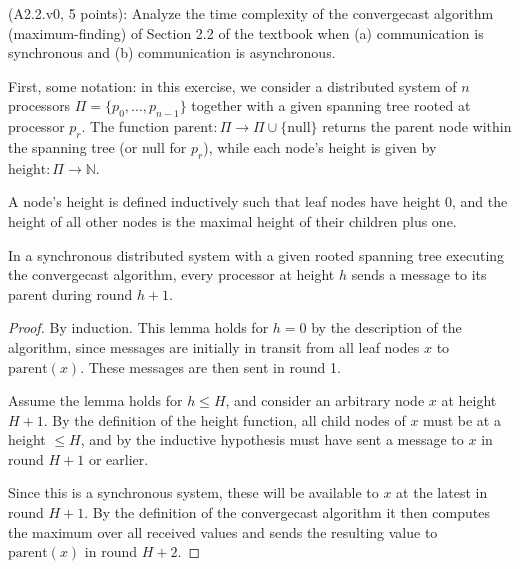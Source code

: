 \begin{Exc}{(A2.2.v0, 5 points):} \label{exc:1}
Analyze the time complexity of the convergecast algorithm
(maximum-finding) of Section 2.2 of the textbook when (a) communication is
synchronous and (b) communication is asynchronous.
\end{Exc}

\begin{comment}
Hint: For the synchronous case, prove that during round t + 1, a processor at
height t sends a message to its parent. For the asynchronous case, prove that
by time t, a processor at height t has sent a message to its parent.
\end{comment}

\newcommand{\prnt}[1]{\text{parent}(#1)}
\newcommand{\hght}[1]{\text{height}(#1)}

First, some notation: in this exercise, we consider a distributed system of $n$
processors $\Pi=\{p_0,\dots,p_{n-1}\}$ together with a given spanning tree
rooted at processor $p_r$. The function
$\text{parent}: \Pi \rightarrow \Pi \cup \{ \text{null} \}$ returns the parent node
within the spanning tree (or null for $p_r$), while each node's height is given by
$\text{height}: \Pi \rightarrow \mathbb{N}$.

\begin{definition}
A node's height is defined inductively such that leaf nodes have height 0,
and the height of all other nodes is the maximal height of their children plus one.
\end{definition}


\begin{lemma} \label{lemma:1sync}
In a synchronous distributed system with a given rooted spanning tree executing the convergecast
algorithm, every processor at height $h$ sends a message to its parent during round $h + 1$.
\end{lemma}

\begin{proof}
By induction. This lemma holds for $h = 0$ by the description of the algorithm, since
messages are initially in transit from all leaf nodes $x$ to $\prnt{x}$. These messages
are then sent in round 1.

Assume the lemma holds for $h \leq H$, and consider an arbitrary node $x$ at height
$H + 1$. By the definition of the height function, all child nodes of $x$ must be at
a height $\leq H$, and by the inductive hypothesis must have sent a message to
$x$ in round $H + 1$ or earlier.

Since this is a synchronous system, these will be available
to $x$ at the latest in round $H + 1$. By the definition of the
convergecast algorithm it then computes the maximum over all received values and
sends the resulting value to $\prnt{x}$ in round $H + 2$.
\end{proof}

